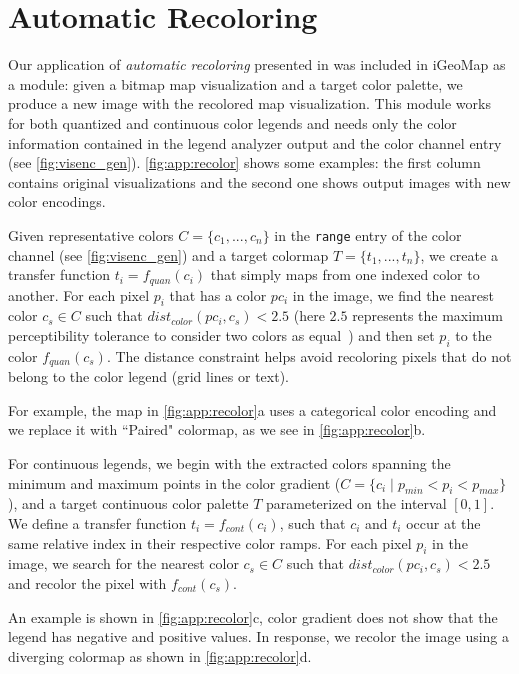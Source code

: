 \section{Automatic Recoloring}
\label{sec:app_autoRecoloring}
Our application of \textit{automatic recoloring} presented in \citep{Poco2017a} was included in iGeoMap as a module: given a bitmap map visualization and a target color palette, we produce a new image with the recolored map visualization. 
This module works for both quantized and continuous color legends and needs only the color information contained in the legend analyzer output and the color channel entry (see \autoref{fig:visenc_gen}). \autoref{fig:app:recolor} shows some examples: the first column contains original visualizations and the second one shows output images with new color encodings.

\figAppRecoloring

Given representative colors $C =\{c_1, ..., c_n\}$ in the \texttt{range} entry of the color channel (see \autoref{fig:visenc_gen}) and a target colormap $T =\{t_1, ..., t_n\}$, we create a transfer function $t_i = f_{quan}(c_i)$ that simply maps from one indexed color to another.
%
For each pixel $p_i$ that has a color $pc_i$ in the image, we find the nearest color $c_s\in C$ such that $dist_{color}(pc_i, c_s) < 2.5$ (here $2.5$ represents the maximum perceptibility tolerance to consider two colors as equal~\citep{Stokes1992}) and then set $p_i$ to the color $f_{quan}(c_s)$. The distance constraint helps avoid recoloring pixels that do not belong to the color legend (\eg grid lines or text).

For example, the map in \autoref{fig:app:recolor}a uses a categorical color encoding and we replace it with ``Paired" colormap, as we see in \autoref{fig:app:recolor}b.


For continuous legends, we begin with the extracted colors spanning the minimum and maximum points in the color gradient ($C = \{c_i\; | \; p_{min} < p_i < p_{max}\}$), and a target continuous color palette $T$ parameterized on the interval $[0,1]$.
%
We define a transfer function $t_i = f_{cont}(c_i)$, such that $c_i$ and $t_i$ occur at the same relative index in their respective color ramps.
%
For each pixel $p_i$ in the image, we search for the nearest color $c_s\in C$ such that $dist_{color}(pc_i, c_s) < 2.5$ and recolor the pixel with $f_{cont}(c_s)$.

An example is shown in \autoref{fig:app:recolor}c, color gradient does not show that the legend has negative and positive values. In response, we recolor the image using a diverging colormap as shown in \autoref{fig:app:recolor}d.


